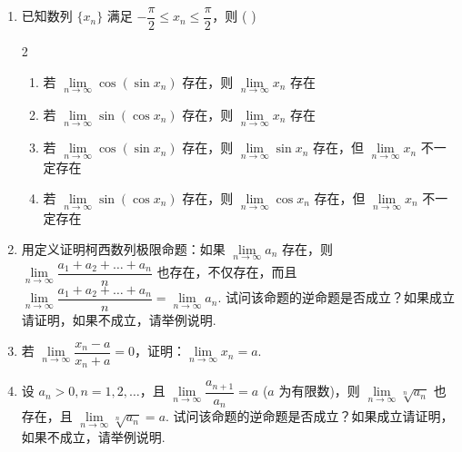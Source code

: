 \begin{enumerate}[label=\textbf{\arabic*.}, itemsep=6cm, resume]

    \item 已知数列 $\{x_n\}$ 满足 $-\dfrac{\pi}{2} \le x_n \le \dfrac{\pi}{2}$，则 ( \quad )
    \begin{multicols}{2}
    \begin{enumerate}[label=(\Alph*)]
        \item 若 $\lim\limits_{n \to \infty} \cos(\sin x_n)$ 存在，则 $\lim\limits_{n \to \infty} x_n$ 存在
        \item 若 $\lim\limits_{n \to \infty} \sin(\cos x_n)$ 存在，则 $\lim\limits_{n \to \infty} x_n$ 存在
        \item 若 $\lim\limits_{n \to \infty} \cos(\sin x_n)$ 存在，则 $\lim\limits_{n \to \infty} \sin x_n$ 存在，但 $\lim\limits_{n \to \infty} x_n$ 不一定存在
        \item 若 $\lim\limits_{n \to \infty} \sin(\cos x_n)$ 存在，则 $\lim\limits_{n \to \infty} \cos x_n$ 存在，但 $\lim\limits_{n \to \infty} x_n$ 不一定存在
    \end{enumerate}
    \end{multicols}

    \item 用定义证明柯西数列极限命题：如果 $\lim\limits_{n \to \infty} a_n$ 存在，则 $\lim\limits_{n \to \infty} \dfrac{a_1 + a_2 + \dots + a_n}{n}$ 也存在，不仅存在，而且 $\lim\limits_{n \to \infty} \dfrac{a_1 + a_2 + \dots + a_n}{n} = \lim\limits_{n \to \infty} a_n$. 试问该命题的逆命题是否成立？如果成立请证明，如果不成立，请举例说明.

    \item 若 $\lim\limits_{n \to \infty} \dfrac{x_n - a}{x_n + a} = 0$，证明：$\lim\limits_{n \to \infty} x_n = a$.

    \item 设 $a_n > 0, n=1,2,\dots$，且 $\lim\limits_{n \to \infty} \dfrac{a_{n+1}}{a_n} = a$ ($a$ 为有限数)，则 $\lim\limits_{n \to \infty} \sqrt[n]{a_n}$ 也存在，且 $\lim\limits_{n \to \infty} \sqrt[n]{a_n} = a$. 试问该命题的逆命题是否成立？如果成立请证明，如果不成立，请举例说明.

\end{enumerate}

\newpage

